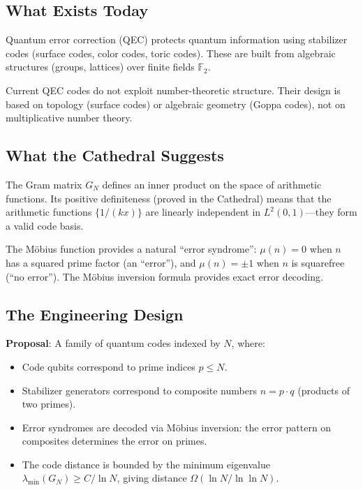 \documentclass[11pt,a4paper]{article}
\begin{document}
\subsection{What Exists Today}

Quantum error correction (QEC) protects quantum information using
stabilizer codes (surface codes, color codes, toric codes). These
are built from algebraic structures (groups, lattices) over finite
fields $\mathbb{F}_2$.

Current QEC codes do not exploit number-theoretic structure. Their
design is based on topology (surface codes) or algebraic geometry
(Goppa codes), not on multiplicative number theory.

\subsection{What the Cathedral Suggests}

The Gram matrix $G_N$ defines an inner product on the space of
arithmetic functions. Its positive definiteness (proved in the
Cathedral) means that the arithmetic functions $\{1/(kx)\}$ are
linearly independent in $L^2(0,1)$---they form a valid code
basis.

The M\"obius function provides a natural ``error syndrome'':
$\mu(n) = 0$ when $n$ has a squared prime factor (an ``error''),
and $\mu(n) = \pm 1$ when $n$ is squarefree (``no error''). The
M\"obius inversion formula provides exact error decoding.

\subsection{The Engineering Design}

\textbf{Proposal}: A family of quantum codes indexed by $N$, where:
\begin{itemize}
  \item Code qubits correspond to prime indices $p \leq N$.
  \item Stabilizer generators correspond to composite numbers
    $n = p \cdot q$ (products of two primes).
  \item Error syndromes are decoded via M\"obius inversion:
    the error pattern on composites determines the error on primes.
  \item The code distance is bounded by the minimum eigenvalue
    $\lambda_{\min}(G_N) \geq C / \ln N$, giving distance
    $\Omega(\ln N / \ln \ln N)$.
\end{itemize}
\end{document}
